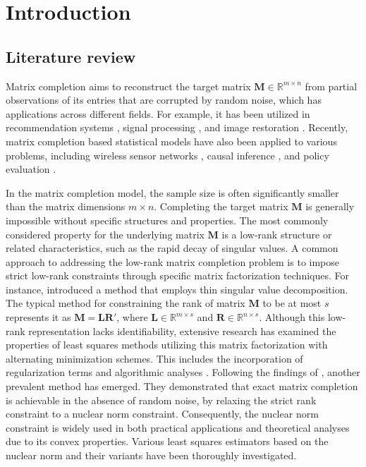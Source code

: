 \documentclass[numsec,webpdf,modern,large,namedate]{oup-authoring-template}
\theoremstyle{plain}
\theoremstyle{remark}
\newcommand{\M}{\bm{M}}
\begin{document}
\maketitle
\vspace{-1cm}
\section{Introduction}

\subsection{Literature review}

Matrix completion aims to reconstruct the target matrix $\M \in \mathbb{R}^{m \times n}$ from partial observations of its entries that are corrupted by random noise, which has applications across different fields.
For example, it has been utilized in recommendation systems \citep{jannach2016recommender}, signal processing \citep{weng2012low}, and image restoration \citep{ji2011robust}.
Recently, matrix completion based statistical models have also been applied to various problems, including wireless sensor networks \citep{kortas2021robust}, causal inference \citep{athey2021matrix}, and policy evaluation \citep{duan2024online}.

In the matrix completion model, the sample size is often significantly smaller than the matrix dimensions $m\times n$. Completing the target matrix $\M$ is generally impossible without specific structures and properties. The most commonly considered property for the underlying matrix $\M$ is a low-rank structure or related characteristics, such as the rapid decay of singular values. A common approach to addressing the low-rank matrix completion problem is to impose strict low-rank constraints through specific matrix factorization techniques. For instance, \cite{keshavan2009matrix} introduced a method that employs thin singular value decomposition. The typical method for constraining the rank of matrix $\M$ to be at most $s$ represents it as $\M = \bm{L}\bm{R}'$, where $\bm{L}\in \mathbb{R}^{m\times s}$ and $\bm{R}\in \mathbb{R}^{n\times s}$. Although this low-rank representation lacks identifiability, extensive research has examined the properties of least squares methods utilizing this matrix factorization with alternating minimization schemes. This includes the incorporation of regularization terms \citep{sun2016guaranteed,ge2016matrix} and algorithmic analyses \citep{jain2013low,hardt2014understanding,zheng2016convergence,ma2018implicit,chen2020nonconvex}. Following the findings of \cite{candes2009exact}, another prevalent method has emerged. They demonstrated that exact matrix completion is achievable in the absence of random noise, by relaxing the strict rank constraint to a nuclear norm constraint. Consequently, the nuclear norm constraint is widely used in both practical applications and theoretical analyses due to its convex properties. Various least squares estimators based on the nuclear norm \citep{candes2010matrix,rohde2011estimation,negahban2011estimation} and their variants \citep{koltchinskii2011nuclear,cai2015rop,cai2016matrix,fang2018max} have been thoroughly investigated.
\end{document}
